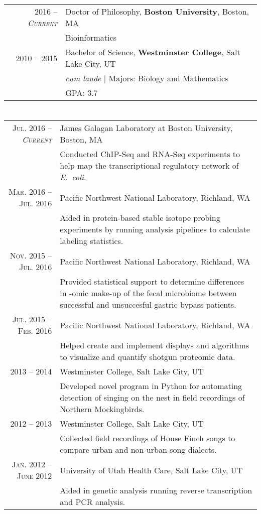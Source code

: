 \documentclass[a4paper,10pt]{article}
\begin{document}
\section{\color{linkcolour}{Education}}
\begin{tabular}{rl}
\textsc{2016 -- \emph{Current}} & Doctor of Philosophy, \textbf{Boston University}, Boston, MA \\
& Bioinformatics \\

 \textsc{2010 -- 2015} & Bachelor of Science, \textbf{Westminster College}, Salt Lake City, UT\\
& \small\emph{cum laude} | Majors: Biology and Mathematics\\
&\normalsize \textsc{GPA}: 3.7
\end{tabular}

\section{\color{linkcolour}{Research}}
\begin{tabular}{rp{10cm}}
\textsc{Jul. 2016 -- \emph{Current}} & James Galagan Laboratory at Boston University, Boston, MA \\
& \footnotesize{Conducted ChIP-Seq and RNA-Seq experiments to help map the transcriptional
	regulatory network of \emph{E.\ coli}.} \\
\textsc{Mar. 2016 -- Jul. 2016} & Pacific Northwest National Laboratory, Richland, WA \\
& \footnotesize{Aided in protein-based stable isotope probing experiments by running analysis pipelines to  calculate labeling statistics.} \\
\textsc{Nov. 2015 -- Jul. 2016} & Pacific Northwest National Laboratory, Richland, WA \\
& \footnotesize{Provided statistical support to determine differences in -omic make-up of the fecal microbiome between successful and unsuccesful gastric bypass patients.} \\
\textsc{Jul. 2015 -- Feb. 2016} & Pacific Northwest National Laboratory, Richland, WA \\
& \footnotesize{Helped create and implement displays and algorithms to visualize and quantify shotgun proteomic data.} \\
 \textsc{2013 -- 2014} & Westminster College, Salt Lake City, UT\\
& \footnotesize{Developed novel program in Python for automating detection of singing on the nest in field recordings of Northern Mockingbirds.}\\
\textsc{2012 -- 2013} & Westminster College, Salt Lake City, UT\\
& \footnotesize{Collected field recordings of House Finch songs to compare urban and non-urban song dialects.}\\
\textsc{Jan. 2012 -- June 2012} & University of Utah Health Care, Salt Lake City, UT
\\& \footnotesize{Aided in genetic analysis running reverse transcription and PCR analysis.}
\end{tabular}
\end{document}
